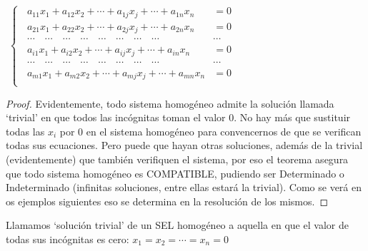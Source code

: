 \centerline{$\boxed{\; \begin{cases}
\;\; a_{11} x_1 + a_{12} x_2 + \cdots + a_{1j} x_j+ \cdots + a_{1n} x_n & = 0\; \\
\;\; a_{21} x_1 + a_{22} x_2 + \cdots + a_{2j} x_j+ \cdots + a_{2n} x_n & = 0\; \\
\;\; \cdots \quad \cdots \quad \cdots 	\quad \cdots \quad \cdots \quad \cdots \quad \cdots \quad \cdots & \cdots \\
\;\; a_{i1} x_1 + a_{i2} x_2 + \cdots + a_{ij} x_j+ \cdots + a_{in} x_n & = 0\; \\
\;\; \cdots \quad \cdots \quad \cdots 	\quad \cdots \quad \cdots \quad \cdots \quad \cdots \quad \cdots & \cdots \\
\;\; a_{m1} x_1 + a_{m2} x_2 + \cdots + a_{mj} x_j+ \cdots + a_{mn} x_n & = 0\; \\
\end{cases}}$}

\begin{proof}
Evidentemente, todo sistema homogéneo admite la solución llamada `trivial' en que todos las incógnitas toman el valor $0$. No hay más que sustituir todas las $x_i$ por $0$ en el sistema homogéneo para convencernos de que se verifican todas sus ecuaciones. Pero puede que hayan otras soluciones, además de la trivial (evidentemente) que también verifiquen el sistema, por eso el teorema asegura que todo sistema homogéneo es COMPATIBLE, pudiendo ser Determinado o Indeterminado (infinitas soluciones, entre ellas estará la trivial). Como se verá en os ejemplos siguientes	eso se determina en la resolución de los mismos.
\end{proof}
\begin{defi}
Llamamos `solución trivial' de un SEL homogéneo a aquella en que el valor de todas sus incógnitas es cero: $x_1=x_2=\cdots=x_n=0$	
\end{defi}

